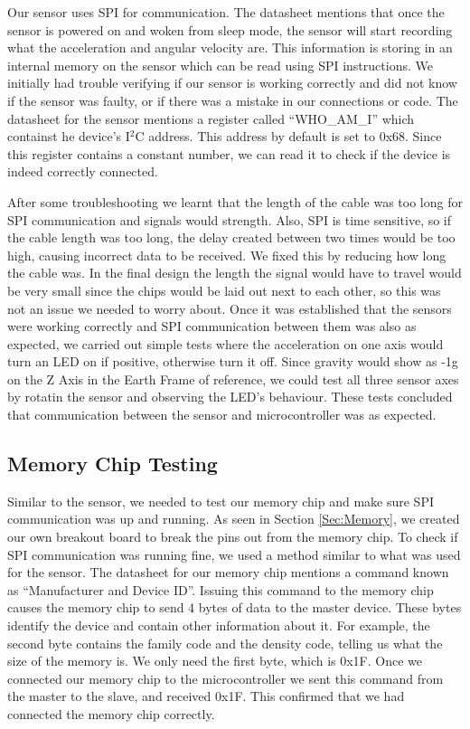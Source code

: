 Our sensor uses SPI for communication.
The datasheet mentions that once the sensor is powered on and woken from sleep mode,
the sensor will start recording what the acceleration and angular velocity are.
This information is storing in an internal memory on the sensor which can be read using SPI instructions.
We initially had trouble verifying if our sensor is working correctly and did not know if the sensor was faulty,
or if there was a mistake in our connections or code.
The datasheet for the sensor mentions a register called ``WHO\_AM\_I'' which containst he device's I$^2$C address.
This address by default is set to 0x68.
Since this register contains a constant number, we can read it to check if the device is indeed correctly connected.

After some troubleshooting we learnt that the length of the cable was too long for SPI communication and signals would strength.
Also, SPI is time sensitive, so if the cable length was too long,
the delay created between two times would be too high,
causing incorrect data to be received.
We fixed this by reducing how long the cable was.
In the final design the length the signal would have to travel would be very small since the chips would be laid out next to each other,
so this was not an issue we needed to worry about.
Once it was established that the sensors were working correctly and SPI communication between them was also as expected,
we carried out simple tests where the acceleration on one axis would turn an LED on if positive,
otherwise turn it off.
Since gravity would show as -1g on the Z Axis in the Earth Frame of reference,
we could test all three sensor axes by rotatin the sensor and observing the LED's behaviour.
These tests concluded that communication between the sensor and microcontroller was as expected.

\subsection{Memory Chip Testing}
\label{Sec:MemoryTesting}
Similar to the sensor, we needed to test our memory chip and make sure SPI communication was up and running.
As seen in Section \ref{Sec:Memory},
we created our own breakout board to break the pins out from the memory chip.
To check if SPI communication was running fine,
we used a method similar to what was used for the sensor.
The datasheet for our memory chip mentions a command known as ``Manufacturer and Device ID''.
Issuing this command to the memory chip causes the memory chip to send 4 bytes of data to the master device.
These bytes identify the device and contain other information about it. 
For example, the second byte contains the family code and the density code,
telling us what the size of the memory is.
We only need the first byte, which is 0x1F.
Once we connected our memory chip to the microcontroller we sent this command from the master to the slave,
and received 0x1F.
This confirmed that we had connected the memory chip correctly.

